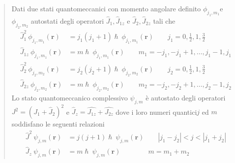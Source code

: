 \begin{quote}
    Dati due stati quantomeccanici con momento angolare definito
    \(\phi_{j_{1},m_{1}}\)e \(\phi_{j_{2},m_{2}}\) autostati degli operatori
    \(\hat{J}_{1},\hat{J}_{1z}\) e \(\hat{J}_{2}, \hat{J}_{2z}\) tali che
    \begin{equation}
        \begin{aligned}
            \hat{J}_{1}^{2} \ \phi_{j_{1},m_{1}}(\bm{r}) &= j_{1}(j_{1}+1) \hslash \ \phi_{j_{1},m_{1}}(\bm{r}) \qquad j_{1} = 0, \frac{1}{2}, 1, \frac{3}{2}\\
            \hat{J}_{1z} \ \phi_{j_{1},m_{1}}(\bm{r}) &= m \hslash \ \phi_{j_{1},m_{1}}(\bm{r})  \qquad m_{1} = -j_{1} , -j_{1} +1, \dots , j_{1}-1, j_{1}
        \end{aligned}
        \label{eq:angular-momentum-theorem-1}
    \end{equation}
    \begin{equation}
        \begin{aligned}
            \hat{J}_{2}^{2} \ \phi_{j_{2},m_{2}}(\bm{r}) &= j_{2}(j_{2}+1) \hslash \ \phi_{j_{2},m_{2}}(\bm{r}) \qquad j_{2} = 0, \frac{1}{2}, 1, \frac{3}{2}\\
            \hat{J}_{2z} \ \phi_{j_{2},m_{2}}(\bm{r}) &= m \hslash \ \phi_{j_{2},m_{2}}(\bm{r})  \qquad m_{2} = -j_{2} , -j_{2} +1, \dots , j_{2}-1, j_{2}
        \end{aligned}
        \label{eq:angular-momentum-theorem-2}
    \end{equation}
    Lo stato quantomeccanico complessivo \(\psi_{j,m}\) è autostato degli
    operatori \(J^{2} = (J_{1} + \hat{J}_{2})^{2}\) e
    \(\hat{J}_{z} = \hat{J_{1z}} + \hat{J_{2z}}\) dove i loro numeri
    quantici\(j\) ed \(m\) soddisfano le seguenti relazioni
    \begin{equation}
        \begin{aligned}
            \hat{J}^{2} \ \psi_{j,m}(\bm{r}) &= j(j+1) \hslash \ \psi_{j,m}(\bm{r}) \qquad | j_{1} - j_{2}|<j<|j_{1}+j_{2}|\\
            \hat{J}_{z} \ \psi_{j,m}(\bm{r}) &= m \hslash \ \psi_{j,m}(\bm{r})  \qquad \qquad m = m_{1}+m_{2}
        \end{aligned}
        \label{eq:angular-momentum-theorem-3}
    \end{equation}
\end{quote}

